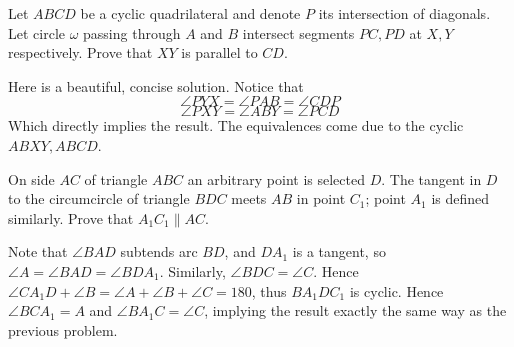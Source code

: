 \documentclass[11pt]{scrartcl}
\begin{document}
\begin{example}
  Let $ABCD$ be a cyclic quadrilateral and denote $P$ its intersection of
  diagonals. Let circle $\omega$ passing through $A$ and $B$ intersect segments
  $PC, PD$ at $X,Y$ respectively. Prove that $XY$ is parallel to $CD$.
\end{example}
\begin{soln}
  Here is a beautiful, concise solution.
  \newline \newline
  Notice that
  $$\angle PYX=\angle PAB=\angle CDP$$
  $$\angle PXY=\angle ABY=\angle PCD$$
  Which directly implies the result. The equivalences come due to the cyclic
  $ABXY, ABCD$.
\end{soln}
\begin{example}
  [Shargyin 2012]
  On side $AC$ of triangle $ABC$ an arbitrary point is selected $D$. The tangent in $D$ to the circumcircle of triangle $BDC$ meets $AB$ in point $C_{1}$; point $A_{1}$ is defined similarly. Prove that $A_{1}C_{1}\parallel AC$.
\end{example}
\begin{soln}
  Note that $\angle BAD$ subtends arc $BD$, and $DA_1$ is a tangent,
  so $\angle A=\angle BAD=\angle BDA_1$. Similarly, $\angle BDC=\angle C$.
  Hence $\angle CA_1D+\angle B=\angle A+\angle B+\angle C=180$, thus
  $BA_1DC_1$ is cyclic. Hence $\angle BCA_1=A$ and $\angle BA_1C=\angle C$,
  implying the result exactly the same way as the previous problem.
\end{soln}
\end{document}
